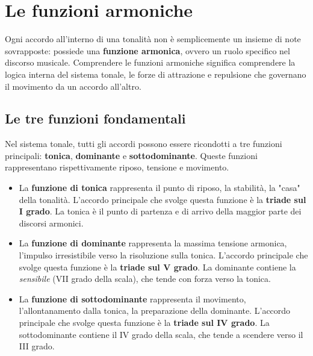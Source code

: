 \chapter{Le funzioni armoniche}
\label{chap:funzioni_armoniche}

Ogni accordo all'interno di una tonalità non è semplicemente un insieme di note sovrapposte: possiede una \textbf{funzione armonica}, ovvero un ruolo specifico nel discorso musicale. Comprendere le funzioni armoniche significa comprendere la logica interna del sistema tonale, le forze di attrazione e repulsione che governano il movimento da un accordo all'altro.

\section{Le tre funzioni fondamentali}
\label{sec:tre_funzioni}

Nel sistema tonale, tutti gli accordi possono essere ricondotti a tre funzioni principali: \textbf{tonica}, \textbf{dominante} e \textbf{sottodominante}. Queste funzioni rappresentano rispettivamente riposo, tensione e movimento.

\begin{esempio}
\end{esempio}

\begin{definizione}
	
	\begin{itemize}
		\item \label{def:funzione_tonica}
		La \textbf{funzione di tonica} rappresenta il punto di riposo, la stabilità, la "casa" della tonalità. L'accordo principale che svolge questa funzione è la \textbf{triade sul I grado}. La tonica è il punto di partenza e di arrivo della maggior parte dei discorsi armonici.
		\item \label{def:funzione_dominante}
		La \textbf{funzione di dominante} rappresenta la massima tensione armonica, l'impulso irresistibile verso la risoluzione sulla tonica. L'accordo principale che svolge questa funzione è la \textbf{triade sul V grado}. La dominante contiene la \textit{sensibile} (VII grado della scala), che tende con forza verso la tonica.
		\item 	\label{def:funzione_sottodominante}
		La \textbf{funzione di sottodominante} rappresenta il movimento, l'allontanamento dalla tonica, la preparazione della dominante. L'accordo principale che svolge questa funzione è la \textbf{triade sul IV grado}. La sottodominante contiene il IV grado della scala, che tende a scendere verso il III grado.
	\end{itemize}
\end{definizione}

